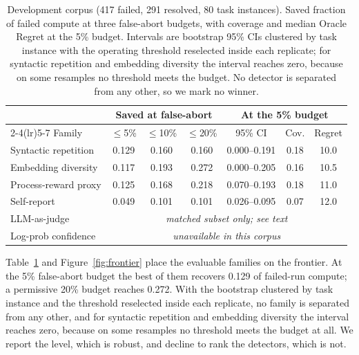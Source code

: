 \documentclass[sigconf,screen]{acmart}
\begin{document}
\begin{table}[t]
\centering
\small
\setlength{\tabcolsep}{3pt}
\caption{Development corpus (417 failed, 291 resolved, 80 task instances). Saved fraction of failed
compute at three false-abort budgets, with coverage and median Oracle Regret at the 5\% budget.
Intervals are bootstrap 95\% CIs clustered by task instance with the operating threshold reselected
inside each replicate; for syntactic repetition and embedding diversity the interval reaches zero,
because on some resamples no threshold meets the budget. No detector is separated from any other, so we mark no winner.}
\begin{tabular}{lcccccc}
\toprule
& \multicolumn{3}{c}{Saved at false-abort} & \multicolumn{3}{c}{At the 5\% budget} \\
\cmidrule(lr){2-4}\cmidrule(lr){5-7}
Family & $\le$5\% & $\le$10\% & $\le$20\% & 95\% CI & Cov. & Regret \\
\midrule
Syntactic repetition & 0.129 & 0.160 & 0.160 & 0.000--0.191 & 0.18 & 10.0 \\
Embedding diversity  & 0.117 & 0.193 & 0.272 & 0.000--0.205 & 0.16 & 10.5 \\
Process-reward proxy & 0.125 & 0.168 & 0.218 & 0.070--0.193 & 0.18 & 11.0 \\
Self-report          & 0.049 & 0.101 & 0.101 & 0.026--0.095 & 0.07 & 12.0 \\
\midrule
LLM-as-judge & \multicolumn{6}{c}{\emph{matched subset only; see text}} \\
Log-prob confidence & \multicolumn{6}{c}{\emph{unavailable in this corpus}} \\
\bottomrule
\end{tabular}
\label{tab:frontier}
\end{table}

Table~\ref{tab:frontier} and Figure~\ref{fig:frontier} place the evaluable families on the
frontier. At the 5\% false-abort budget the best of them recovers 0.129 of failed-run compute; a
permissive 20\% budget reaches 0.272. With the bootstrap clustered by task instance and the
threshold reselected inside each replicate, no family is separated from any other, and for
syntactic repetition and embedding diversity the interval reaches zero, because on some
resamples no threshold meets the budget at all.
We report the level, which is robust, and decline to rank the detectors, which is not.
\end{document}
